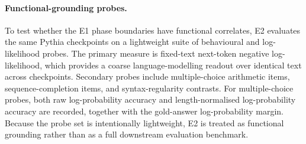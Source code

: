 

\paragraph{Functional-grounding probes.}
To test whether the E1 phase boundaries have functional correlates, E2 evaluates the same Pythia checkpoints on a lightweight suite of behavioural and log-likelihood probes. The primary measure is fixed-text next-token negative log-likelihood, which provides a coarse language-modelling readout over identical text across checkpoints. Secondary probes include multiple-choice arithmetic items, sequence-completion items, and syntax-regularity contrasts. For multiple-choice probes, both raw log-probability accuracy and length-normalised log-probability accuracy are recorded, together with the gold-answer log-probability margin. Because the probe set is intentionally lightweight, E2 is treated as functional grounding rather than as a full downstream evaluation benchmark.
